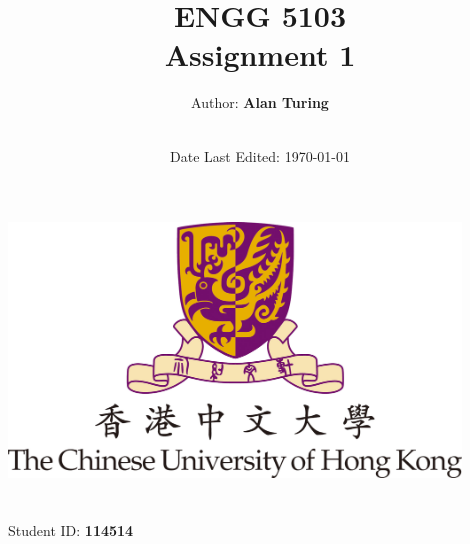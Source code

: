 \title{\Large ENGG 5103  \\[0.5cm]
        \bf\Large Assignment 1}
\author{\large Author: \bf Alan Turing\\ \ \\}
\date{\large Date Last Edited: \today}

\makeatletter
    \begin{titlepage}
        \begin{center}
	   { \includegraphics[width=12cm]{CUHK-logo.png}}
	   {\ \\ \ \\}
        \vbox{}\vspace{5cm}
            {\@title }\\[3cm] 
            {\@author}
            {\large Student ID: \bf 114514\\ \ \\}
            {\@date\\}

        \end{center}
    \end{titlepage}
\makeatother
